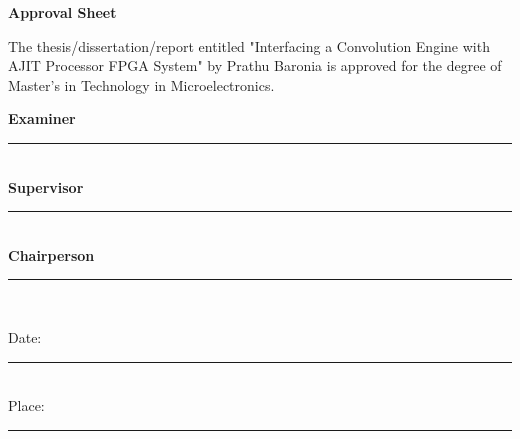 \thispagestyle{empty}

\begin{center}
{\Large \textbf{Approval Sheet}}%
\end{center}

\setlength{\parindent}{0em}
The thesis/dissertation/report entitled "Interfacing a Convolution Engine with AJIT Processor FPGA System" by Prathu Baronia is approved for the degree of
Master's in Technology in Microelectronics.

\begin{flushright}
\textbf{Examiner} \\
\vspace{2cm}
\rule{8cm}{.4pt}\\
\vspace{2cm}
\textbf{Supervisor} \\
\vspace{2cm}
\rule{8cm}{.4pt}\\
\vspace{2cm}
\textbf{Chairperson} \\
\vspace{2cm}
\rule{8cm}{.4pt}\\
\vspace{2cm}
\end{flushright}

\begin{flushleft}
Date: \rule{4cm}{.4pt}\\
Place: \rule{4cm}{.4pt}\\
\end{flushleft}

\afterpage{\blankpage}
\clearpage
